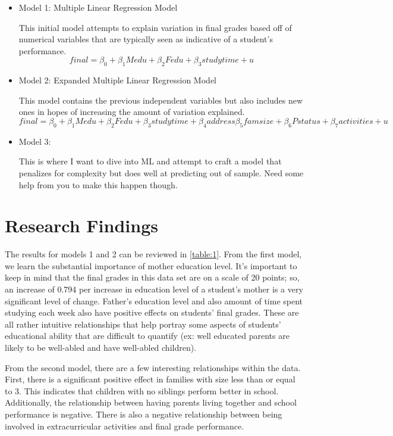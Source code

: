 \documentclass[12pt,english]{article}
\begin{document}
 \begin{itemize}
        \item Model 1: Multiple Linear Regression Model
        
This initial model attempts to explain variation in final grades based off of numerical variables that are typically seen as indicative of a student's performance. 
\begin{equation}
    final = \beta_0 + \beta_1Medu + \beta_2Fedu + \beta_3studytime + u
\end{equation}
\item Model 2: Expanded Multiple Linear Regression Model

This model contains the previous independent variables but also includes new ones in hopes of increasing the amount of variation explained. 
\begin{equation}
    final = \beta_0 + \beta_1Medu + \beta_2Fedu + \beta_3studytime + \beta_4address \beta_5famsize + \beta_6Pstatus + \beta_7activities + u
\end{equation}

\item Model 3: 

This is where I want to dive into ML and attempt to craft a model that penalizes for complexity but does well at predicting out of sample. Need some help from you to make this happen though.
\end{itemize}
\pagebreak{}

\section{Research Findings}\label{sec:results}
The results for models 1 and 2 can be reviewed in \ref{table:1}. From the first model, we learn the substantial importance of mother education level. It's important to keep in mind that the final grades in this data set are on a scale of 20 points; so, an increase of 0.794 per increase in education level of a student's mother is a very significant level of change. Father's education level and also amount of time spent studying each week also have positive effects on students' final grades. These are all rather intuitive relationships that help portray some aspects of students' educational ability that are difficult to quantify (ex: well educated parents are likely to be well-abled and have well-abled children). 

From the second model, there are a few interesting relationships within the data. First, there is a significant positive effect in families with size less than or equal to 3. This indicates that children with no siblings perform better in school. Additionally, the relationship between having parents living together and school performance is negative. There is also a negative relationship between being involved in extracurricular activities and final grade performance. 
\end{document}

